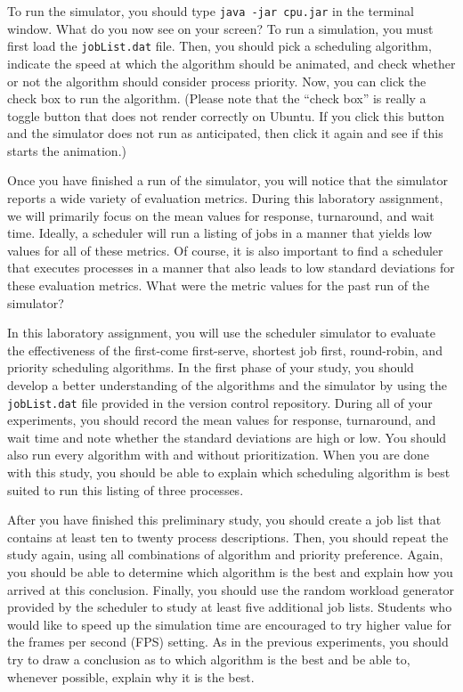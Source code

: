   To run the simulator, you should type {\tt java -jar cpu.jar} in the terminal window.  What do you now see on your
  screen? To run a simulation, you must first load the {\tt jobList.dat} file.  Then, you should pick a scheduling
  algorithm, indicate the speed at which the algorithm should be animated, and check whether or not the algorithm should
  consider process priority. Now, you can click the check box to run the algorithm. (Please note that the ``check box''
  is really a toggle button that does not render correctly on Ubuntu. If you click this button and the simulator does
  not run as anticipated, then click it again and see if this starts the animation.)

  Once you have finished a run of the simulator, you will notice that the simulator reports a wide variety of evaluation
  metrics. During this laboratory assignment, we will primarily focus on the mean values for response, turnaround, and
  wait time. Ideally, a scheduler will run a listing of jobs in a manner that yields low values for all of these
  metrics. Of course, it is also important to find a scheduler that executes processes in a manner that also leads to low
  standard deviations for these evaluation metrics. What were the metric values for the past run of the simulator?


  In this laboratory assignment, you will use the scheduler simulator to evaluate the effectiveness of the first-come
  first-serve, shortest job first, round-robin, and priority scheduling algorithms.  In the first phase of your study,
  you should develop a better understanding of the algorithms and the simulator by using the {\tt jobList.dat} file
  provided in the version control repository. During all of your experiments, you should record the mean values for
  response, turnaround, and wait time and note whether the standard deviations are high or low. You should also run
  every algorithm with and without prioritization. When you are done with this study, you should be able to explain
  which scheduling algorithm is best suited to run this listing of three processes. 

  After you have finished this preliminary study, you should create a job list that contains at least ten to twenty
  process descriptions.  Then, you should repeat the study again, using all combinations of algorithm and priority
  preference.  Again, you should be able to determine which algorithm is the best and explain how you arrived at this
  conclusion. Finally, you should use the random workload generator provided by the scheduler to study at least five
  additional job lists. Students who would like to speed up the simulation time are encouraged to try higher value for
  the frames per second (FPS) setting. As in the previous experiments, you should try to draw a conclusion as to which
  algorithm is the best and be able to, whenever possible, explain why it is the best.

